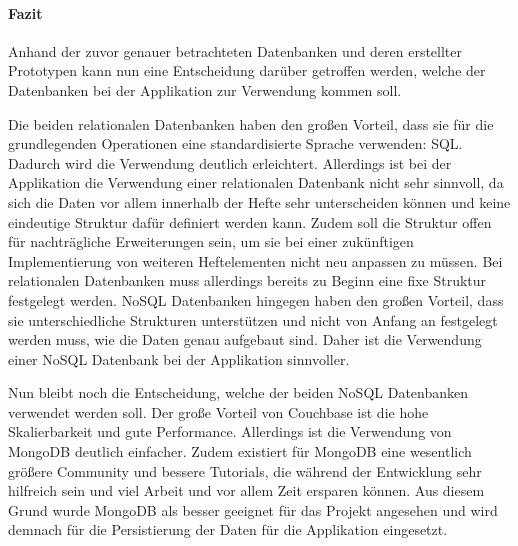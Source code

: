 \newpage

\paragraph{Fazit}
Anhand der zuvor genauer betrachteten Datenbanken und deren erstellter Prototypen kann nun eine Entscheidung darüber getroffen werden, welche der Datenbanken bei der Applikation zur Verwendung kommen soll.

Die beiden relationalen Datenbanken haben den großen Vorteil, dass sie für die grundlegenden Operationen eine standardisierte Sprache verwenden: SQL. Dadurch wird die Verwendung deutlich erleichtert. Allerdings ist bei der Applikation die Verwendung einer relationalen Datenbank nicht sehr sinnvoll, da sich die Daten vor allem innerhalb der Hefte sehr unterscheiden können und keine eindeutige Struktur dafür definiert werden kann. Zudem soll die Struktur offen für nachträgliche Erweiterungen sein, um sie bei einer zukünftigen Implementierung von weiteren Heftelementen nicht neu anpassen zu müssen. Bei relationalen Datenbanken muss allerdings bereits zu Beginn eine fixe Struktur festgelegt werden. NoSQL Datenbanken hingegen haben den großen Vorteil, dass sie unterschiedliche Strukturen unterstützen und nicht von Anfang an festgelegt werden muss, wie die Daten genau aufgebaut sind. Daher ist die Verwendung einer NoSQL Datenbank bei der Applikation sinnvoller.

Nun bleibt noch die Entscheidung, welche der beiden NoSQL Datenbanken verwendet werden soll. Der große Vorteil von Couchbase ist die hohe Skalierbarkeit und gute Performance. Allerdings ist die Verwendung von MongoDB deutlich einfacher. Zudem existiert für MongoDB eine wesentlich größere Community und bessere Tutorials, die während der Entwicklung sehr hilfreich sein und viel Arbeit und vor allem Zeit ersparen können. Aus diesem Grund wurde MongoDB als besser geeignet für das Projekt angesehen und wird demnach für die Persistierung der Daten für die Applikation eingesetzt.